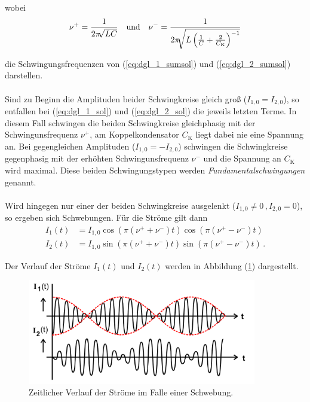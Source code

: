 wobei 
\begin{align} \label{eq:resonanzfrequenzen}
    \nu^+ &= \frac {1} {2 \pi \sqrt[]{LC}} & \mbox{\centering und} && \nu^- = \frac {1} {2 \pi \sqrt [] {L \left( \frac{1}{C} + \frac{2}{C_\text{K}} \right)^{-1} }}
\end{align}

die Schwingungsfrequenzen von (\ref{eq:dgl_1_sumsol}) und (\ref{eq:dgl_2_sumsol}) darstellen. \\
\\
Sind zu Beginn die Amplituden beider Schwingkreise gleich groß ($I_{1,0} = I_{2,0}$), so entfallen bei (\ref{eq:dgl_1_sol}) und (\ref{eq:dgl_2_sol})
die jeweils letzten Terme. In diesem Fall schwingen die beiden Schwingkreise gleichphasig mit der Schwingunsfrequenz $\nu^+$, am
Koppelkondensator $C_\text{K}$ liegt dabei nie eine Spannung an. Bei gegengleichen Amplituden ($I_{1,0} = -I_{2,0}$) schwingen die Schwingkreise gegenphasig
mit der erhöhten Schwingunsfrequenz $\nu^-$ und die Spannung an $C_\text{K}$ wird maximal. Diese beiden Schwingungstypen werden \textit{Fundamentalschwingungen} genannt. \\
\\
Wird hingegen nur einer der beiden Schwingkreise ausgelenkt ($I_{1,0} \neq 0 \, , I_{2,0} = 0$), so ergeben sich Schwebungen.
Für die Ströme gilt dann
\begin{align}
    I_{1}(t) &= I_{1,0} \cos(\pi (\nu^+ + \nu^-) t) \cos(\pi (\nu^+ - \nu^-) t) \label{eq:dgl_1_sol_schweb} \\
    I_{2}(t) &= I_{1,0} \sin(\pi (\nu^+ + \nu^-) t) \sin(\pi (\nu^+ - \nu^-) t) \, .\label{eq:dgl_2_sol_schweb} 
\end{align}

Der Verlauf der Ströme $I_{1}(t)$ und $I_{2}(t)$ werden in Abbildung (\ref{fig:schwebung}) dargestellt.
\begin{figure} 
    \centering
    \includegraphics[width=10cm] {pictures/schwebung.png} 
    \caption{Zeitlicher Verlauf der Ströme im Falle einer Schwebung. \cite{v355}}
    \label{fig:schwebung}
\end{figure} 

